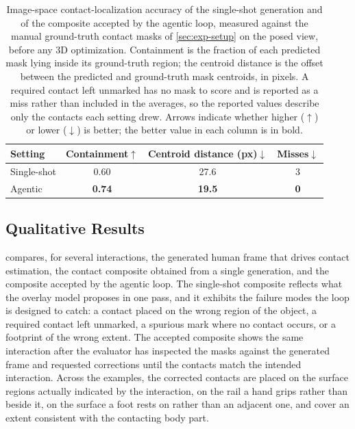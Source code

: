 \begin{table}[!htbp]
  \centering
  \caption[Image-space contact-localization accuracy.]{Image-space contact-localization accuracy of the single-shot generation and of the composite accepted by the agentic loop, measured against the manual ground-truth contact masks of \cref{sec:exp-setup} on the posed view, before any 3D optimization. Containment is the fraction of each predicted mask lying inside its ground-truth region; the centroid distance is the offset between the predicted and ground-truth mask centroids, in pixels. A required contact left unmarked has no mask to score and is reported as a miss rather than included in the averages, so the reported values describe only the contacts each setting drew. Arrows indicate whether higher ($\uparrow$) or lower ($\downarrow$) is better; the better value in each column is in bold.}
  \label{tab:agentic-imagespace}
  \setlength{\tabcolsep}{12pt}
  \begin{tabular}{lccc}
    \toprule
    Setting & Containment$\uparrow$ & Centroid distance (px)$\downarrow$ & Misses$\downarrow$ \\
    \midrule
    Single-shot & 0.60 & 27.6 & 3 \\
    Agentic     & \textbf{0.74} & \textbf{19.5} & \textbf{0} \\
    \bottomrule
  \end{tabular}
\end{table}

\subsection{Qualitative Results}
\label{sec:exp-agentic-qual}

 compares, for several interactions, the generated human frame that drives contact estimation, the contact composite obtained from a single generation, and the composite accepted by the agentic loop. The single-shot composite reflects what the overlay model proposes in one pass, and it exhibits the failure modes the loop is designed to catch: a contact placed on the wrong region of the object, a required contact left unmarked, a spurious mark where no contact occurs, or a footprint of the wrong extent. The accepted composite shows the same interaction after the evaluator has inspected the masks against the generated frame and requested corrections until the contacts match the intended interaction. Across the examples, the corrected contacts are placed on the surface regions actually indicated by the interaction, on the rail a hand grips rather than beside it, on the surface a foot rests on rather than an adjacent one, and cover an extent consistent with the contacting body part.


